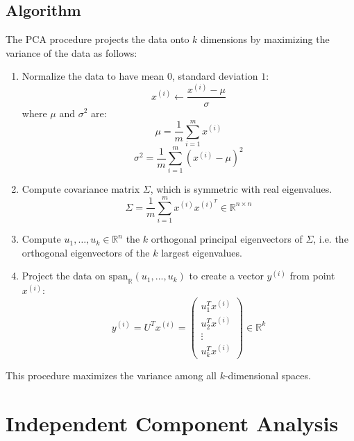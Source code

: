 \documentclass[twoside,twocolumn]{article}
\begin{document}
\subsection{Algorithm}
The PCA procedure projects the data onto $k$ dimensions by maximizing the variance
of the data as follows:
\begin{enumerate}
  \item Normalize the data to have mean $0$, standard deviation $1$:
    \begin{equation} x^{(i)}\leftarrow\frac{x^{(i)}-\mu}{\sigma} \end{equation}
      where $\mu$ and $\sigma^2$ are:
      \begin{equation} \mu = \frac{1}{m}\sum_{i=1}^mx^{(i)} \end{equation}
      \begin{equation} \sigma^2=\frac{1}{m}\sum_{i=1}^m(x^{(i)}-\mu)^2 \end{equation}
  \item Compute covariance matrix $\Sigma$, which is symmetric with real eigenvalues.
    \begin{equation} \Sigma = \frac{1}{m}\sum_{i=1}^m x^{(i)}x^{(i)^T} \in \mathbb{R}^{n \times n} \end{equation}
  \item Compute $u_1, \hdots, u_k \in \mathbb{R}^{n}$ the $k$ orthogonal principal
    eigenvectors of $\Sigma$, i.e. the orthogonal eigenvectors of the $k$
    largest eigenvalues.
  \item Project the data on $\textrm{span}_\mathbb{R}(u_1,...,u_k)$ to create
    a vector $y^{(i)}$ from point $x^{(i)}$:
    \begin{equation} y^{(i)} = U^T x^{(i)} = \left( \begin{array} { c } { u _ { 1 } ^ { T } x ^ { ( i ) } } \\ { u _ { 2 } ^ { T } x ^ { ( i ) } } \\ { \vdots } \\ { u _ { k } ^ { T } x ^ { ( i ) } } \end{array} \right) \in \mathbb { R } ^ { k } \end{equation}
\end{enumerate}
This procedure maximizes the variance among all $k$-dimensional spaces.
\section{Independent Component Analysis}
\end{document}
